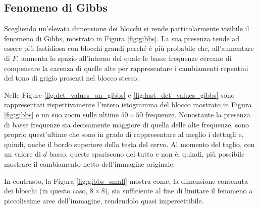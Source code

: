 \subsection{Fenomeno di Gibbs}

Scegliendo un'elevata dimensione dei blocchi si rende particolarmente visibile il fenomeno di Gibbs, mostrato in Figura \ref{fig:gibbs}. La sua presenza tende ad essere più fastidiosa con blocchi grandi perché è più probabile che, all'aumentare di $F$, aumenta lo spazio all'interno del quale le basse frequenze cercano di compensare la carenza di quelle alte per rappresentare i cambiamenti repentini del tono di grigio presenti nel blocco stesso.

Nelle Figure \ref{fig:dct_values_on_gibbs} e \ref{fig:last_dct_values_gibbs} sono rappresentati rispettivamente l'intero istogramma del blocco mostrato in Figura \ref{fig:gibbs} e un suo zoom sulle ultime $50 \times 50$ frequenze. Nonostante la presenza di basse frequenze sia decisamente maggiore di quella delle alte frequenze, sono proprio quest'ultime che sono in grado di rappresentare al meglio i dettagli e, quindi, anche il bordo superiore della testa del cervo. Al momento del taglio, con un valore di $d$ basso, queste spariscono del tutto e non è, quindi, più possibile mostrare il cambiamento netto dell'immagine originale.

In contrasto, la Figura \ref{fig:gibbs_small} mostra come, la dimensione contenuta dei blocchi (in questo caso, $8 \times 8$), sia sufficiente al fine di limitare il fenomeno a piccolissime aree dell'immagine, rendendolo quasi impercettibile.

